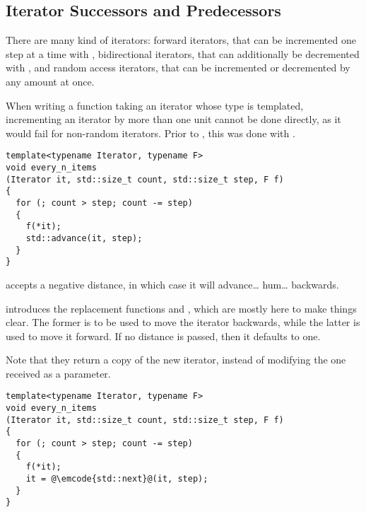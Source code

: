 \subsection{Iterator Successors and Predecessors}

There are many kind of iterators: forward iterators, that can be
incremented one step at a time with , bidirectional
iterators, that can additionally be decremented with
, and random access iterators, that can be
incremented or decremented by any amount at once.

When writing a function taking an iterator whose type is templated,
incrementing an iterator by more than one unit cannot be done
directly, as it would fail for non-random iterators. Prior to ,
this was done with .

\begin{lstlisting}
template<typename Iterator, typename F>
void every_n_items
(Iterator it, std::size_t count, std::size_t step, F f)
{
  for (; count > step; count -= step)
  {
    f(*it);
    std::advance(it, step);
  }
}
\end{lstlisting}

 accepts a negative distance, in which case it
will advance… hum… backwards.

%
%
 introduces the replacement functions  and
, which are mostly here to make things clear. The
former is to be used to move the iterator backwards, while the latter
is used to move it forward. If no distance is passed, then it defaults
to one.

Note that they return a copy of the new iterator, instead of modifying
the one received as a parameter.

\begin{lstlisting}
template<typename Iterator, typename F>
void every_n_items
(Iterator it, std::size_t count, std::size_t step, F f)
{
  for (; count > step; count -= step)
  {
    f(*it);
    it = @\emcode{std::next}@(it, step);
  }
}
\end{lstlisting}
